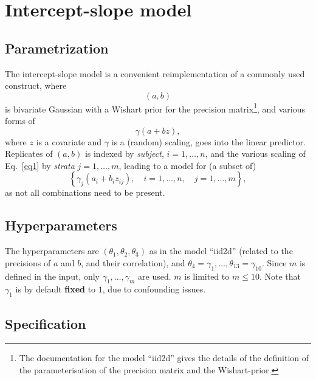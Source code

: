 \documentclass[a4paper,11pt]{article}
\begin{document}
\section*{Intercept-slope model}

\subsection*{Parametrization}

The intercept-slope model is a convenient reimplementation of a
commonly used construct, where
\begin{displaymath}
    (a,b)
\end{displaymath}
is bivariate Gaussian with a Wishart prior for the precision
matrix\footnote{The documentation for the model ``iid2d'' gives the
    details of the definition of the parameterisation of the precision
    matrix and the Wishart-prior.}, and various forms of
\begin{equation}\label{eq1}%
    \gamma(a + bz),
\end{equation}
where $z$ is a covariate and $\gamma$ is a (random) scaling, goes into
the linear predictor. Replicates of $(a,b)$ is indexed by
\emph{subject}, $i=1, \ldots, n$, and the various scaling of
Eq.~\ref{eq1} by \emph{strata} $j=1, \ldots, m$, leading to a model
for (a subset of)
\begin{displaymath}
    \left\{\gamma_j(a_i + b_i z_{ij}), \quad i=1, \ldots,n, \quad j=1,\ldots,m\right\},
\end{displaymath}
as not all combinations need to be present.

\subsection*{Hyperparameters}

The hyperparameters are $(\theta_1,\theta_2,\theta_3)$ as in the model
``iid2d'' (related to the precisions of $a$ and $b$, and their
correlation), and
$\theta_4=\gamma_1, \ldots, \theta_{13}=\gamma_{10}$. Since $m$ is
defined in the input, only $\gamma_1, \ldots, \gamma_m$ are used. $m$
is limited to $m \le 10$. Note that $\gamma_1$ is by default
\textbf{fixed} to $1$, due to confounding issues.


\subsection*{Specification}
\end{document}
